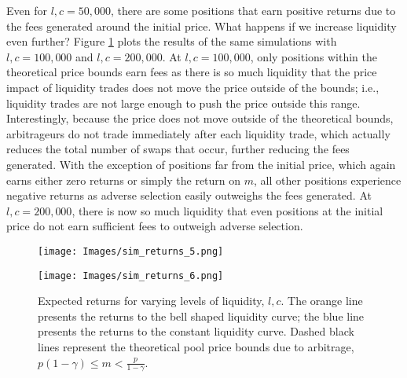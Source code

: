 \documentclass[11pt]{article}
\begin{document}
Even for $l, c = 50,000$, there are some positions that earn positive returns due to the fees generated around the initial price. What happens if we increase liquidity even further? Figure \ref{fig:sim_returns_5-6} plots the results of the same simulations with $l, c = 100,000$ and $l, c = 200,000$. At $l, c = 100,000$, only positions within the theoretical price bounds earn fees as there is so much liquidity that the price impact of liquidity trades does not move the price outside of the bounds; i.e., liquidity trades are not large enough to push the price outside this range. Interestingly, because the price does not move outside of the theoretical bounds, arbitrageurs do not trade immediately after each liquidity trade, which actually reduces the total number of swaps that occur, further reducing the fees generated. With the exception of positions far from the initial price, which again earns either zero returns or simply the return on $m$, all other positions experience negative returns as adverse selection easily outweighs the fees generated. At $l, c = 200,000$, there is now so much liquidity that even positions at the initial price do not earn sufficient fees to outweigh adverse selection.

\begin{figure}[H]
    \centering
    \begin{minipage}[b]{\textwidth}
        \texttt{[image: Images/sim\_returns\_5.png]}
    \end{minipage}
    \begin{minipage}[b]{\textwidth}
        \texttt{[image: Images/sim\_returns\_6.png]}
    \end{minipage}
    \caption{Expected returns for varying levels of liquidity, $l, c$. The orange line presents the returns to the bell shaped liquidity curve; the blue line presents the returns to the constant liquidity curve. Dashed black lines represent the theoretical pool price bounds due to arbitrage, $p (1 - \gamma) \le m < \frac{p}{1 - \gamma}$.}
    \label{fig:sim_returns_5-6}
\end{figure}
\end{document}
